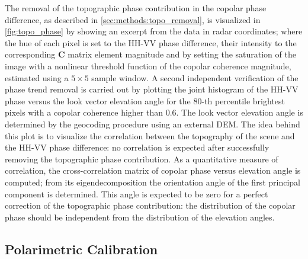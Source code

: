 The removal of the topographic phase contribution in the copolar phase difference, as described in \autoref{sec:methods:topo_removal}, is visualized in  \autoref{fig:topo_phase} by showing an excerpt from the data in radar coordinates; where the hue of each pixel is set to the HH-VV phase difference, their intensity to the corresponding $\mathbf{C}$ matrix element magnitude and by setting the saturation of the image with a nonlinear threshold function of the copolar coherence magnitude, estimated using a $\mathrm{5 \times 5}$ sample window. A second independent verification of the phase trend removal is carried out by plotting the joint histogram of the HH-VV phase versus the look vector elevation angle for the 80-th percentile brightest pixels with a copolar coherence higher than 0.6. The look vector elevation angle is determined by the geocoding procedure using an external DEM. The idea behind this plot is to visualize the correlation between the topography of the scene and the HH-VV phase difference: no correlation is expected after successfully removing the topographic phase contribution. As a quantitative measure of correlation, the cross-correlation matrix of copolar phase versus elevation angle is computed; from its eigendecomposition the orientation angle of the first principal component is determined. This angle is expected to be zero for a perfect correction of the topographic phase contribution: the distribution of the copolar phase should be independent from the distribution of the elevation angles.

\subsection{Polarimetric Calibration}\label{sec:results:proc_polcal}

